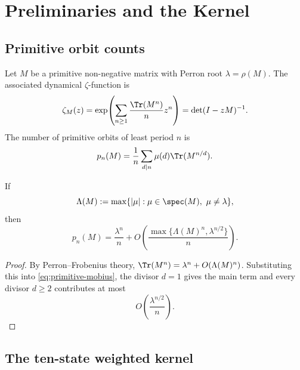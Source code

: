\section{Preliminaries and the Kernel}\label{sec:preliminaries}

\subsection{Primitive orbit counts}

Let \(M\) be a primitive non-negative matrix with Perron root
\(\lambda=\rho(M)\). The associated dynamical \(\zeta\)-function is
\[
  \zeta_M(z)
  =\exp\!\left(\sum_{n\ge 1}\frac{\Tr(M^n)}{n}z^n\right)
  =\det(I-zM)^{-1}.
\]
The number of primitive orbits of least period \(n\) is
\begin{equation}\label{eq:primitive-mobius}
  p_n(M)=\frac{1}{n}\sum_{d\mid n}\mu(d)\Tr(M^{n/d}).
\end{equation}

\begin{lemma}\label{lem:primitive-orbit-asymptotic}\label{prop:prelim-prime-orbit}
If
\[
  \Lambda(M):=\max\{|\mu|:\mu\in\spec(M),\ \mu\neq\lambda\},
\]
then
\[
  p_n(M)=\frac{\lambda^n}{n}
  +O\!\left(\frac{\max\{\Lambda(M)^n,\lambda^{n/2}\}}{n}\right).
\]
\end{lemma}

\begin{proof}
By Perron--Frobenius theory,
\(
  \Tr(M^n)=\lambda^n+O(\Lambda(M)^n)
\).
Substituting this into \eqref{eq:primitive-mobius}, the divisor \(d=1\)
gives the main term and every divisor \(d\ge 2\) contributes at most
\[
  O\!\left(\frac{\lambda^{n/2}}{n}\right).
\]
\end{proof}

\subsection{The ten-state weighted kernel}

